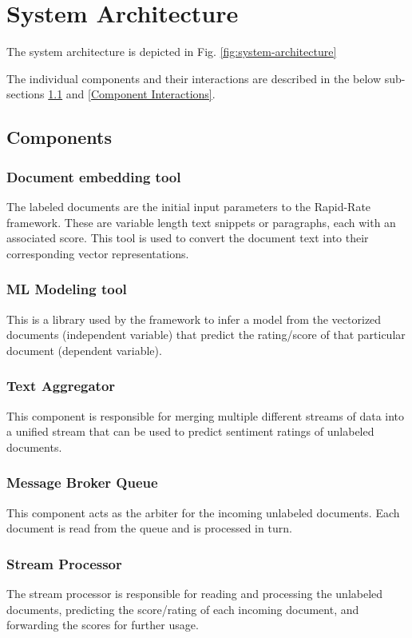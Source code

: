 \documentclass[conference]{IEEEtran}
\begin{document}
\vspace{5mm}

\section{System Architecture}
The system architecture is depicted in Fig. \ref{fig:system-architecture}

The individual components and their interactions are described in the below sub-sections \ref{Components} and \ref{Component Interactions}.

\subsection{Components} \label{Components}

\subsubsection{Document embedding tool}
The labeled documents are the initial input parameters to the Rapid-Rate framework. These are variable length text snippets or paragraphs, each with an associated score. This tool is used to convert the document text into their corresponding vector representations.

\subsubsection{ML Modeling tool}
This is a library used by the framework to infer a model from the vectorized documents (independent variable) that predict the rating/score of that particular document (dependent variable). 

\subsubsection{Text Aggregator}
This component is responsible for merging multiple different streams of data into a unified stream that can be used to predict sentiment ratings of unlabeled documents.

\subsubsection{Message Broker Queue}
This component acts as the arbiter for the incoming unlabeled documents. 
Each document is read from the queue and is processed in turn.

\subsubsection{Stream Processor}
The stream processor is responsible for reading and processing the unlabeled documents, predicting the score/rating of each incoming document, and forwarding the scores for further usage.
\end{document}
